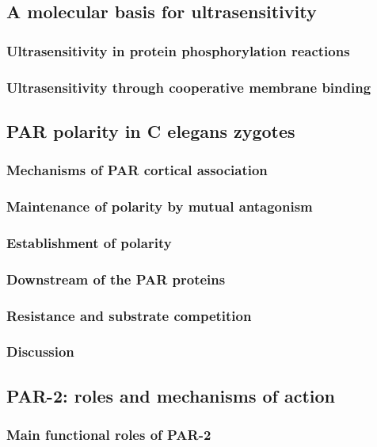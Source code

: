 \documentclass[11pt]{"article"}
\begin{document}
\clearpage
\subsection{A molecular basis for ultrasensitivity}
\subsubsection{Ultrasensitivity in protein phosphorylation reactions}
\subsubsection{Ultrasensitivity through cooperative membrane binding}

\clearpage
\subsection{PAR polarity in C elegans zygotes}
\subsubsection{Mechanisms of PAR cortical association}
\subsubsection{Maintenance of polarity by mutual antagonism}
\subsubsection{Establishment of polarity}
\subsubsection{Downstream of the PAR proteins}
\subsubsection{Resistance and substrate competition}
\subsubsection{Discussion}

\clearpage
\subsection{PAR-2: roles and mechanisms of action}
\subsubsection{Main functional roles of PAR-2}
\end{document}
